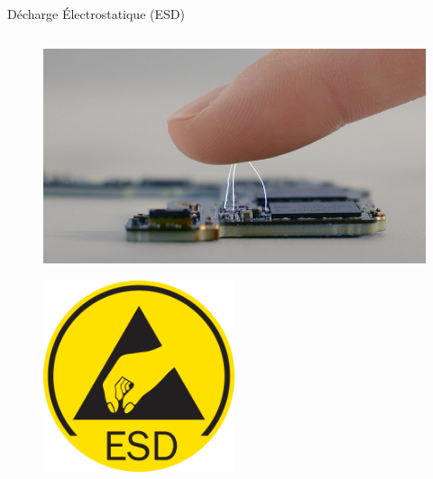 \begin{frame}{Décharge Électrostatique (ESD)}
\begin{columns}
        \begin{column}{0.33\textwidth}
            \begin{figure}
                \centering
                \includegraphics[width=\textwidth]{pictures/ESD-discharge-finger.png}
            \end{figure}
            \begin{figure}
                \centering
                \includegraphics[width=0.5\textwidth]{pictures/ESD-logo.png}
            \end{figure}
        \end{column}
    \end{columns}
\end{frame}

